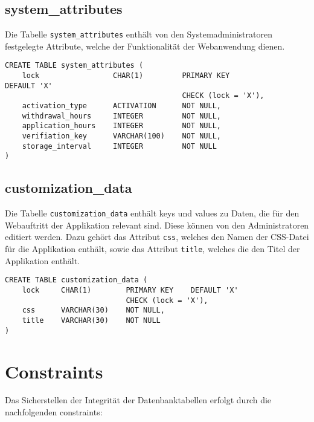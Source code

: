 \subsection{system\_attributes}
Die Tabelle \texttt{system\_attributes} enthält von den Systemadministratoren festgelegte Attribute, welche der Funktionalität der Webanwendung dienen.

\begin{verbatim}
CREATE TABLE system_attributes (
    lock                 CHAR(1)         PRIMARY KEY    									 DEFAULT 'X'
                                         CHECK (lock = 'X'),
    activation_type      ACTIVATION      NOT NULL,
    withdrawal_hours     INTEGER         NOT NULL,
    application_hours    INTEGER         NOT NULL,
    verifiation_key      VARCHAR(100)    NOT NULL,
    storage_interval     INTEGER         NOT NULL
)
\end{verbatim}

\subsection{customization\_data}
Die Tabelle \texttt{customization\_data} enthält keys und values zu Daten, die für den Webauftritt der Applikation relevant sind. Diese können von den Administratoren editiert werden. Dazu gehört das Attribut \texttt{css}, welches den Namen der CSS-Datei für die Applikation enthält, sowie das Attribut \texttt{title}, welches die den Titel der Applikation enthält.

\begin{verbatim}
CREATE TABLE customization_data (
    lock     CHAR(1)        PRIMARY KEY    DEFAULT 'X'
                            CHECK (lock = 'X'),
    css      VARCHAR(30)    NOT NULL,
    title    VARCHAR(30)    NOT NULL
)
\end{verbatim}

\section{Constraints}
Das Sicherstellen der Integrität der Datenbanktabellen erfolgt durch die nachfolgenden constraints:

